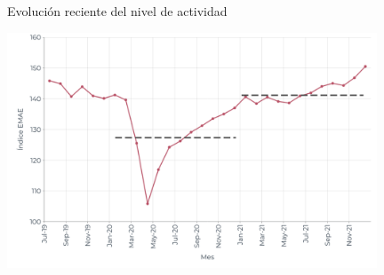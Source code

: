 \documentclass{beamer}
\begin{document}
\begin{frame}{Evolución reciente del nivel de actividad}

    \centering\includegraphics[width=11cm]{../Figures/32.16.pdf}

\end{frame}
\end{document}
